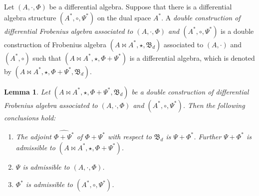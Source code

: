 \documentclass[pdftex]{sigma}
\numberwithin{equation}{section}
\newtheorem{Lemma}[Theorem]{Lemma}
\begin{document}
\begin{Definition}
 Let $(A, \cdot, \Phi)$ be a differential algebra.
 Suppose that there is a differential algebra structure $(A^*, \circ, \Psi^*)$ on the dual space $A^{*}$.
 A \textit{double construction of differential Frobenius algebra associated to $(A, \cdot, \Phi)$ and $(A^*, \circ, \Psi^*)$} is
 a double construction of Frobenius algebra $(A \bowtie A^*,\allowbreak \star, \mathfrak{B}_d)$
 associated to $(A, \cdot)$ and $(A^*, \circ)$
 such that $(A \bowtie A^*, \star, \Phi + \Psi^*)$ is a differential algebra,
 which is denoted by $(A \bowtie A^*, \star, \Phi + \Psi^*, \mathfrak{B}_d)$.
\end{Definition}

\begin{Lemma}\label{lem:douadm}
 Let $(A \bowtie A^*, \star, \Phi + \Psi^*, \mathfrak{B}_d)$ be a double construction of differential Frobenius algebra associated to $(A, \cdot, \Phi)$ and $(A^*, \circ, \Psi^*)$. Then the following conclusions hold:
 \begin{enumerate}\itemsep=0pt
 \item[$(1)$] The adjoint $\widehat{\Phi + \Psi^*}$ of $\Phi + \Psi^*$ with respect to $\mathfrak{B}_d$ is $\Psi + \Phi^*$.
 Further $\Psi + \Phi^*$ is admissible to $(A \bowtie A^*,\star, \Phi + \Psi^*)$.
 \item[$(2)$] $\Psi$ is admissible to $(A, \cdot, \Phi)$.
 \item[$(3)$] $\Phi^*$ is admissible to $(A^*, \circ, \Psi^*)$.
 \end{enumerate}
\end{Lemma}
\end{document}
